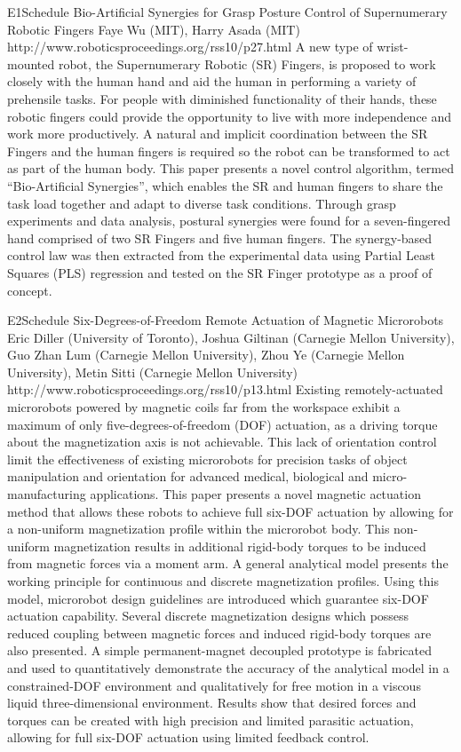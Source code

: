 \begin{spacing}{1.0}
\descriptionPaper
{E1}{Schedule}
{	
Bio-Artificial Synergies for Grasp Posture Control of Supernumerary Robotic Fingers 
}
{
Faye Wu (MIT), Harry Asada (MIT)
}
{
http://www.roboticsproceedings.org/rss10/p27.html
}
{
A new type of wrist-mounted robot, the Supernumerary Robotic (SR) Fingers, is proposed to work closely with the human hand and aid the human in performing a variety of prehensile tasks. For people with diminished functionality of their hands, these robotic fingers could provide the opportunity to live with more independence and work more productively. A natural and implicit coordination between the SR Fingers and the human fingers is required so the robot can be transformed to act as part of the human body. This paper presents a novel control algorithm, termed “Bio-Artificial Synergies”, which enables the SR and human fingers to share the task load together and adapt to diverse task conditions. Through grasp experiments and data analysis, postural synergies were found for a seven-fingered hand comprised of two SR Fingers and five human fingers. The synergy-based control law was then extracted from the experimental data using Partial Least Squares (PLS) regression and tested on the SR Finger prototype as a proof of concept.
}



\descriptionPaper
{E2}{Schedule}
{	
Six-Degrees-of-Freedom Remote Actuation of Magnetic Microrobots
}
{
Eric Diller (University of Toronto), Joshua Giltinan (Carnegie Mellon University), Guo Zhan Lum (Carnegie Mellon University), Zhou Ye (Carnegie Mellon University), Metin Sitti (Carnegie Mellon University)
}
{
http://www.roboticsproceedings.org/rss10/p13.html
}
{
Existing remotely-actuated microrobots powered by magnetic coils far from the workspace exhibit a maximum of only five-degrees-of-freedom (DOF) actuation, as a driving torque about the magnetization axis is not achievable. This lack of orientation control limit the effectiveness of existing microrobots for precision tasks of object manipulation and orientation for advanced medical, biological and micro-manufacturing applications. This paper presents a novel magnetic actuation method that allows these robots to achieve full six-DOF actuation by allowing for a non-uniform magnetization profile within the microrobot body. This non-uniform magnetization results in additional rigid-body torques to be induced from magnetic forces via a moment arm. A general analytical model presents the working principle for continuous and discrete magnetization profiles. Using this model, microrobot design guidelines are introduced which guarantee six-DOF actuation capability. Several discrete magnetization designs which possess reduced coupling between magnetic forces and induced rigid-body torques are also presented. A simple permanent-magnet decoupled prototype is fabricated and used to quantitatively demonstrate the accuracy of the analytical model in a constrained-DOF environment and qualitatively for free motion in a viscous liquid three-dimensional environment. Results show that desired forces and torques can be created with high precision and limited parasitic actuation, allowing for full six-DOF actuation using limited feedback control.
}





\end{spacing}
